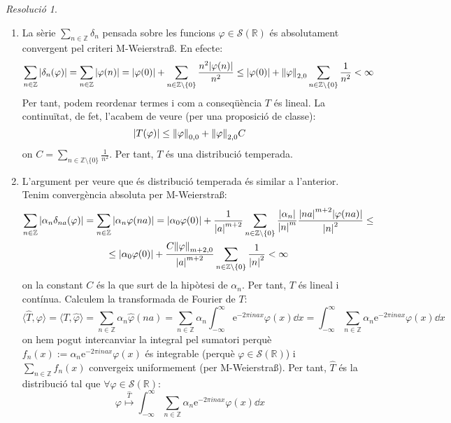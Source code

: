 \documentclass[10pt,a4paper]{article}
\newcommand{\ZZ}{\ensuremath{\mathbb{Z}}} %
\newcommand{\RR}{\ensuremath{\mathbb{R}}} %
\theoremstyle{definition}
\theoremstyle{remark}
\newtheorem*{res}{Resolució}
\renewcommand{\exp}[1]{\mathrm{e}^{#1}} %
\begin{document}
\begin{res}\hfill
  \begin{enumerate}
    \item La sèrie $\sum_{n\in\ZZ}\delta_n$ pensada sobre les funcions $\varphi\in\mathcal{S}(\RR)$ és absolutament convergent pel criteri M-Weierstra\ss. En efecte:
          $$
            \sum_{n\in\ZZ}\abs{\delta_n(\varphi)}=\sum_{n\in\ZZ}\abs{\varphi(n)}=\abs{\varphi(0)}+\sum_{n\in\ZZ\setminus\{0\}}\frac{n^2\abs{\varphi(n)}}{n^2}\leq \abs{\varphi(0)}+\norm{\varphi}_{2,0}\sum_{n\in\ZZ\setminus\{0\}}\frac{1}{n^2}<\infty
          $$
          Per tant, podem reordenar termes i com a conseqüència $T$ és lineal. La continuïtat, de fet, l'acabem de veure (per una proposició de classe):
          $$
            \abs{T(\varphi)}\leq \norm{\varphi}_{0,0}+\norm{\varphi}_{2,0}C
          $$
          on $C=\sum_{n\in\ZZ\setminus\{0\}}\frac{1}{n^2}$. Per tant, $T$ és una distribució temperada.
    \item L'argument per veure que és distribució temperada és similar a l'anterior. Tenim convergència absoluta per M-Weierstra\ss:
          \begin{multline*}
            \sum_{n\in\ZZ}\abs{\alpha_n\delta_{na}(\varphi)}=\sum_{n\in\ZZ}\abs{\alpha_n\varphi(na)}=\abs{\alpha_0\varphi(0)}+\frac{1}{\abs{a}^{m+2}}\sum_{n\in\ZZ\setminus\{0\}}\frac{\abs{\alpha_n}}{\abs{n}^m}\frac{\abs{na}^{m+2}\abs{\varphi(na)}}{\abs{n}^2}\leq \\
            \leq\abs{\alpha_0\varphi(0)}+\frac{C\norm{\varphi}_{m+2,0}}{\abs{a}^{m+2}}\sum_{n\in\ZZ\setminus\{0\}} \frac{1}{\abs{n}^2}<\infty
          \end{multline*}
          on la constant $C$ és la que surt de la hipòtesi de $\alpha_n$. Per tant, $T$ és lineal i contínua.
          Calculem la transformada de Fourier de $T$:
          $$
            \langle\widehat{T},\varphi\rangle=\langle T,\widehat{\varphi}\rangle=\sum_{n\in\ZZ}\alpha_n\widehat{\varphi}(na)=\sum_{n\in\ZZ}\alpha_n\int_{-\infty}^\infty\exp{-2\pi i na x}\varphi(x)\dd{x}=\int_{-\infty}^\infty\sum_{n\in\ZZ}\alpha_n\exp{-2\pi i na x}\varphi(x)\dd{x}
          $$
          on hem pogut intercanviar la integral pel sumatori perquè $f_n(x):=\alpha_n\exp{-2\pi i na x}\varphi(x)$ és integrable (perquè $\varphi\in\mathcal{S}(\RR)$) i $\sum_{n\in \ZZ}f_n(x)$ convergeix uniformement (per M-Weierstra\ss). Per tant, $\widehat{T}$ és la distribució tal que $\forall\varphi\in \mathcal{S}(\RR)$:
          $$
            \varphi\overset{\widehat{T}}\longmapsto \int_{-\infty}^\infty\sum_{n\in\ZZ}\alpha_n\exp{-2\pi i na x}\varphi(x)\dd{x}
          $$
  \end{enumerate}
\end{res}
\end{document}
